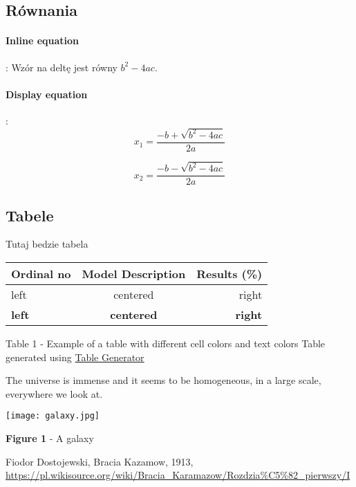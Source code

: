 \documentclass{article}
\begin{document}
\subsection{Równania}
\paragraph{Inline equation}: 
Wzór na deltę jest równy $b^2-4ac$.

\paragraph{Display equation}:
\[
x_1 = \frac{-b + \sqrt{b^2 - 4ac}}{2a}
\]

\[
x_2 = \frac{-b - \sqrt{b^2 - 4ac}}{2a}
\]



\subsection{Tabele}

Tutaj bedzie tabela

\begin{center}
    \begin{table}[H]
        \centering
        \begin{tabular}{lcr}
        \toprule
        Ordinal no                   & \multicolumn{1}{l|}{Model Description}    & Results (\%)                          \\ \midrule
        \cellcolor[HTML]{9AFF99}left & {\color[HTML]{986536} centered}           & \cellcolor[HTML]{CBCEFB}right         \\ \midrule
        \textbf{left}                & \cellcolor[HTML]{FFFE65}\textbf{centered} & {\color[HTML]{6200C9} \textbf{right}} \\ \bottomrule
        \end{tabular}
    \end{table}
    Table 1 - Example of a table with different cell colors and text colors
    Table generated using \href{https://www.tablesgenerator.com/}{Table Generator}
\end{center}

The universe is immense and it seems to be homogeneous, in a large scale, everywhere we look at.


\begin{center}
    \texttt{[image: galaxy.jpg]}
\end{center}
\begin{center}
    \textbf{Figure 1} - A galaxy
\end{center}

\begin{thebibliography}{9}
 Fiodor Dostojewski, Bracia Kazamow, 1913, \url{https://pl.wikisource.org/wiki/Bracia_Karamazow/Rozdzia%C5%82_pierwszy/I}

\end{thebibliography}
\end{document}
